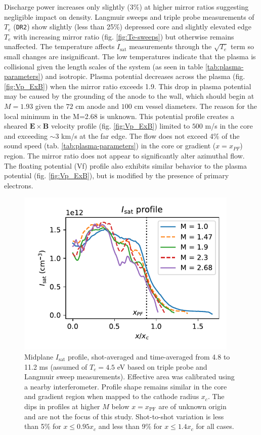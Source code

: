 Discharge power increases only slightly ($3\%$) at higher mirror ratios suggesting negligible impact on density. Langmuir sweeps and triple probe measurements of $T_e$ (\texttt{DR2}) show slightly (less than 25\%) depressed core and slightly elevated edge $T_e$ with increasing mirror ratio (fig. \ref{fig:Te-sweeps}) but otherwise remains unaffected. The temperature affects $I_\text{sat}$ measurements through the $\sqrt{T_e}$ term so small changes are insignificant. The low temperatures indicate that the plasma is collisional given the length scales of the system (as seen in table \ref{tab:plasma-parameters}) and isotropic. Plasma potential decreases across the plasma (fig. \ref{fig:Vp_ExB}) when the mirror ratio exceeds 1.9. This drop in plasma potential may be caused by the grounding of the anode to the wall, which should begin at $M=1.93$ given the $72$ cm anode and $100$ cm vessel diameters. The reason for the local minimum in the M=2.68 is unknown. This potential profile creates a sheared $\boldsymbol{E \times B}$ velocity profile (fig. \ref{fig:Vp_ExB}) limited to $500$ m/s in the core and exceeding $\sim 3$ km/s at the far edge. The flow does not exceed 4\% of the sound speed (tab. \ref{tab:plasma-parameters}) in the core or gradient ($x=x_{PF}$) region. The mirror ratio does not appear to significantly alter azimuthal flow. The floating potential (Vf) profile also exhibits similar behavior to the plasma potential (fig. \ref{fig:Vp_ExB}), but is modified by the presence of primary electrons. 



\begin{figure}
    \centering
    \includegraphics[width=300pt]{figures/fig3.pdf}
    \caption[Midplane $I_\text{sat}$ profile]{Midplane $I_\text{sat}$ profile, shot-averaged and time-averaged from 4.8 to 11.2 ms (assumed of $T_e = 4.5$ eV based on triple probe and Langmuir sweep measurements). Effective area was calibrated using a nearby interferometer. Profile shape remains similar in the core and gradient region when mapped to the cathode radius $x_c$. The dips in profiles at higher $M$ below $x=x_\text{PF}$ are of unknown origin and are not the focus of this study. Shot-to-shot variation is less than 5\% for $x \leq 0.95 x_c$ and less than 9\% for $x \leq 1.4 x_c$ for all cases.}
    \label{fig:isat_profile}
\end{figure}

